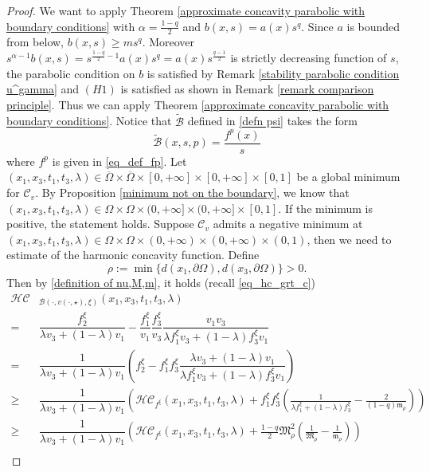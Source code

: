 \documentclass[11pt, reqno]{amsart}
\theoremstyle{definition}
\numberwithin{equation}{section}
\newcommand{\Omegabar}{\overline{\Omega}}
\newcommand{\Btilde}{\widetilde{\mathscr{B}}}
\begin{document}
\begin{proof}
	We want to apply Theorem \ref{approximate concavity parabolic with boundary conditions} with $\alpha=	\frac{1-q}{2}
	$ and $b(x,s)=a(x)s^q$. Since $a$ is bounded from below, $b(x,s)\geq m s^q$. Moreover $s^{\alpha-1}b(x,s)=s^{\frac{1-q}{2}-1}a(x)s^q=a(x)s^{\frac{q-1}{2}}$ is strictly decreasing function of $s$, the parabolic condition on $b$ is satisfied by Remark \ref{stability parabolic condition u^gamma} and \hyperlink{H1}{\( (H1) \)} is satisfied as shown in Remark \ref{remark comparison principle}. 
	Thus we can apply Theorem \ref{approximate concavity parabolic with boundary conditions}. 
	Notice that $\Btilde$ defined in \eqref{defn psi} takes the form
	\[\Btilde(x,s,p)=\dfrac{f^p(x)}{s}\]
	where $f^p$ is given in \eqref{eq_def_fp}.
	Let $(x_1,x_3,t_1,t_3,\lambda)\in \Omegabar\times \Omegabar\times [0,+\infty]\times [0,+\infty]\times [0,1]$ be a global minimum for $\mathcal{C}_{v}$. 
	By Proposition \ref{minimum not on the boundary}, we know that $(x_1,x_3,t_1,t_3,\lambda)\in \Omega\times \Omega\times (0,+\infty]\times (0,+\infty]\times [0,1]$. 
	If the minimum is positive, the statement holds. 
	Suppose $\mathcal{C}_{v}$ admits a negative minimum at $(x_1,x_3,t_1,t_3,\lambda)\in \Omega\times \Omega\times (0,+\infty)\times (0,+\infty)\times (0,1)$, then we need to estimate of the harmonic concavity function. 
	Define 
	\[\rho:=\min \big\{d(x_1,\partial\Omega),d(x_3,\partial \Omega)\big\}>0. \]
	Then by \eqref{definition of nu,M,m}, it holds (recall \eqref{eq_hc_grt_c})
	\begin{align*}
		\mathcal{HC}&_{\mathscr{B}(\cdot,v(\cdot,\star),\xi)}(x_1,x_3,t_1,t_3,\lambda)\\
		= & \dfrac{f^{\xi}_2}{\lambda v_3 +(1-\lambda)v_1}-\dfrac{f^{\xi}_1}{v_1}\dfrac{f^{\xi}_3}{ v_3 }\dfrac{v_1 v_3 }{\lambda f^{\xi}_1 v_3 +(1-\lambda)f^{\xi}_3v_1}\\
		=& \dfrac{1}{\lambda v_3 +(1-\lambda)v_1}\left( f^{\xi}_2-f^{\xi}_1f^{\xi}_3\dfrac{\lambda v_3 +(1-\lambda)v_1}{\lambda f^{\xi}_1 v_3 +(1-\lambda)f^{\xi}_3v_1}\right)\\
		\geq & \dfrac{1}{\lambda v_3 +(1-\lambda)v_1} \left(\mathcal{HC}_{f^{\xi}}(x_1,x_3,t_1,t_3,\lambda)+f^{\xi}_1f^{\xi}_3\left(\frac{1}{\lambda f^{\xi}_1+(1-\lambda)f^{\xi}_3}-\frac{2}{(1-q) \mathfrak{m}_{\rho} } \right)\right) \\
				\geq & \dfrac{1}{\lambda v_3 +(1-\lambda)v_1} \left(\mathcal{HC}_{f^{\xi}}(x_1,x_3,t_1,t_3,\lambda)+\frac{1-q}{2} \mathfrak{M}_{\rho} ^2\left(\frac{1}{ \mathfrak{M}_{\rho} }-\frac{1}{ \mathfrak{m}_{\rho} } \right)\right) \\

\end{align*}
\end{proof}
\end{document}
